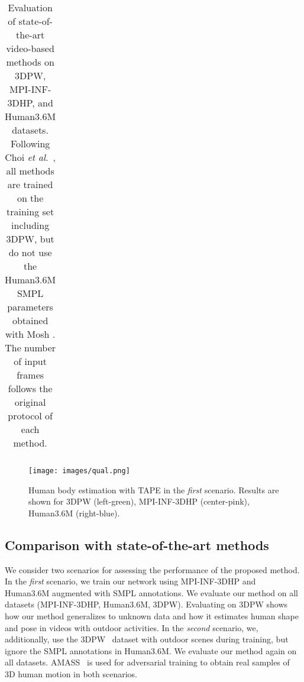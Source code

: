\documentclass[runningheads]{llncs}
\newcommand{\etal}{\textit{et al}.}
\begin{document}
\begin{table*}[t]
\begin{adjustbox}{width={\textwidth},,totalheight={\textheight},keepaspectratio}
\begin{tabular}{|c|cccc|ccc|ccc|}
\end{tabular}
\end{adjustbox}
\caption{Evaluation of state-of-the-art video-based methods on 3DPW, MPI-INF-3DHP, and Human3.6M datasets. Following Choi \etal~\cite{choi2020beyond}, 
all methods are trained on the training set including 3DPW, but do not use the Human3.6M SMPL parameters obtained with Mosh \cite{Loper:SIGASIA:2014}. The number of input frames follows the original protocol of each method.}
\label{w3dpw}
\end{table*}

\begin{figure}[t]
    \centering
    \texttt{[image: images/qual.png]}
    \caption{Human body estimation with TAPE in the \textit{first} scenario. Results are shown for 3DPW (left-green), MPI-INF-3DHP (center-pink), Human3.6M (right-blue).}
    \label{qual_alldatasets}
\end{figure}
\subsection{ Comparison with state-of-the-art methods}

We consider two scenarios for assessing the performance of the proposed method. In the \textit{first} scenario, we train our network using MPI-INF-3DHP and Human3.6M augmented with SMPL annotations. We evaluate our method on all datasets (MPI-INF-3DHP, Human3.6M, 3DPW). Evaluating on 3DPW shows how our method generalizes to unknown data and how it estimates human shape and pose in videos with outdoor activities. In the \textit{second} scenario, we, additionally, use  the 3DPW~\cite{vonMarcard2018} dataset  with outdoor scenes during training, but ignore the SMPL annotations in Human3.6M. We evaluate our method again on all datasets. AMASS~\cite{AMASS:ICCV:2019} is used for adversarial training to obtain real samples of 3D human motion in both scenarios. 
\end{document}
